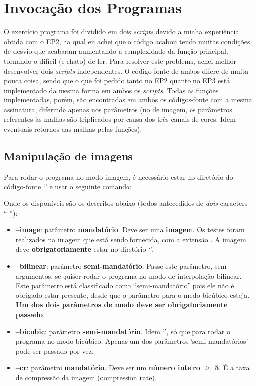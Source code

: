 \documentclass[11pt]{article}
\begin{document}
\pagebreak

\section{Invocação dos Programas}

\indent\indent O exercício programa foi dividido em dois \textit{scripts} devido a minha experiência obtida com o EP2, na qual eu achei que o código acabou tendo muitas condições de desvio
que acabaram aumentando a complexidade da função principal, tornando-o difícil (e chato) de ler. Para resolver este problema, achei melhor desenvolver dois \textit{scripts} independentes. O código-fonte
de ambos difere de muita pouca coisa, sendo que o que foi pedido tanto no EP2 quanto no EP3 está implementado da mesma forma em ambos os \textit{scripts}. Todas as funções implementadas, porém, são encontradas
em ambos os códigos-fonte com a mesma assinatura, diferindo apenas nos parâmetros (no de imagem, os parâmetros referentes às malhas são triplicados por causa dos três canais de cores. Idem eventuais retornos das malhas
pelas funções).

\subsection{Manipulação de imagens}

\indent\indent Para rodar o programa no modo imagem, é necessário estar no diretório do código-fonte `{}' e usar o seguinte comando:

\begin{flushleft}
  {}
\end{flushleft}

Onde os {} disponíveis são os descritos abaixo (todos antecedidos de \textit{dois} caracters ``-''):


\begin{itemize}
  \item \textbf{--image}: parâmetro \textbf{mandatório}. Deve ser uma \textbf{imagem}. Os testes foram realizados na imagem que está sendo fornecida, com a extensão {}. A
  imagem deve \textbf{obrigatoriamente} estar no diretório `{}'.
  \item \textbf{--bilinear}: parâmetro \textbf{semi-mandatório}. Passe este parâmetro, sem argumentos, se quiser rodar o programa no modo de interpolação bilinear. Este
  parâmetro está classificado como ``semi-mandatório'' pois ele não é obrigado estar presente, desde que o parâmetro para o modo bicúbico esteja. \textbf{Um dos dois parâmetros de modo
  deve ser obrigatoriamente passado}.
  \item \textbf{--bicubic}: parâmetro \textbf{semi-mandatório}. Idem `{}', só que para rodar o programa no modo bicúbico. Apenas um dos parâmetros `semi-mandatórios' pode ser passado por vez.
  \item \textbf{--cr}: parâmetro \textbf{mandatório}. Deve ser um \textbf{número inteiro $\geq$ 5}. É a taxa de compressão da imagem (\textbf{c}ompression \textbf{r}ate).
\end{itemize}
\end{document}
